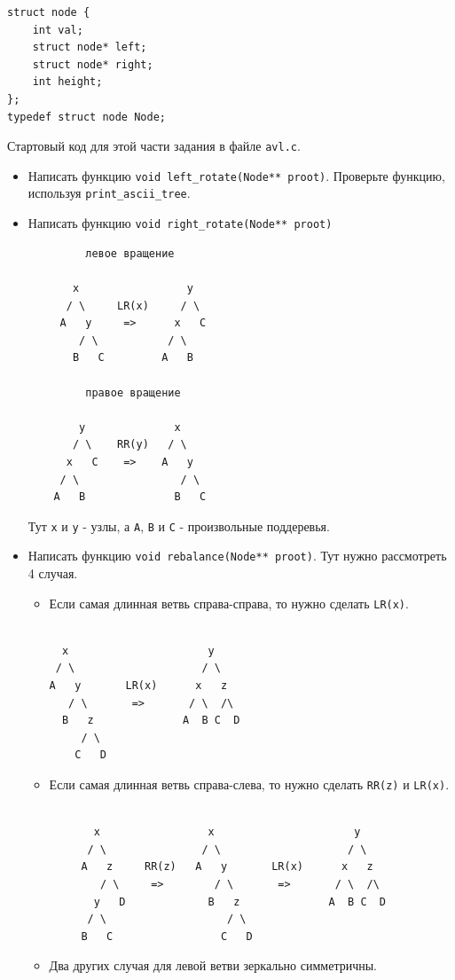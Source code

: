 \documentclass{article}
\begin{document}
\begin{lstlisting}
struct node {
    int val;
    struct node* left;
    struct node* right;
    int height;
};
typedef struct node Node;
\end{lstlisting}
Стартовый код для этой части задания в файле \texttt{avl.c}.
\begin{itemize}
\item Написать функцию \texttt{void left\_rotate(Node** proot)}. Проверьте функцию, используя \texttt{print\_ascii\_tree}.
\item Написать функцию \texttt{void right\_rotate(Node** proot)}
\begin{multicols}{2}
\noindent
\begin{lstlisting}
         левое вращение

       x                 y     
      / \     LR(x)     / \     
     A   y     =>      x   C    
        / \           / \       
       B   C         A   B      

         правое вращение
   
        y              x 
       / \    RR(y)   / \
      x   C    =>    A   y
     / \                / \
    A   B              B   C
\end{lstlisting}
\end{multicols}
Тут \texttt{x} и \texttt{y} - узлы, а \texttt{A}, \texttt{B} и \texttt{С} - произвольные поддеревья.
\item Написать функцию \texttt{void rebalance(Node** proot)}. Тут нужно рассмотреть 4 случая. 
\begin{itemize}
\item Если самая длинная ветвь справа-справа, то нужно сделать \texttt{LR(x)}.
\begin{lstlisting}
       
  x                      y                  
 / \                    / \                  
A   y       LR(x)      x   z                 
   / \       =>       / \  /\                        
  B   z              A  B C  D                          
     / \                                        
    C   D                                         
\end{lstlisting}
\item Если самая длинная ветвь справа-слева, то нужно сделать \texttt{RR(z)} и \texttt{LR(x)}.
\begin{lstlisting}
       
       x                 x                      y                  
      / \               / \                    / \                  
     A   z     RR(z)   A   y       LR(x)      x   z                 
        / \     =>        / \       =>       / \  /\                        
       y   D             B   z              A  B C  D                          
      / \                   / \                                        
     B   C                 C   D                                         
\end{lstlisting}
\item Два других случая для левой ветви зеркально симметричны.
\end{itemize}


\end{itemize}
\end{document}
